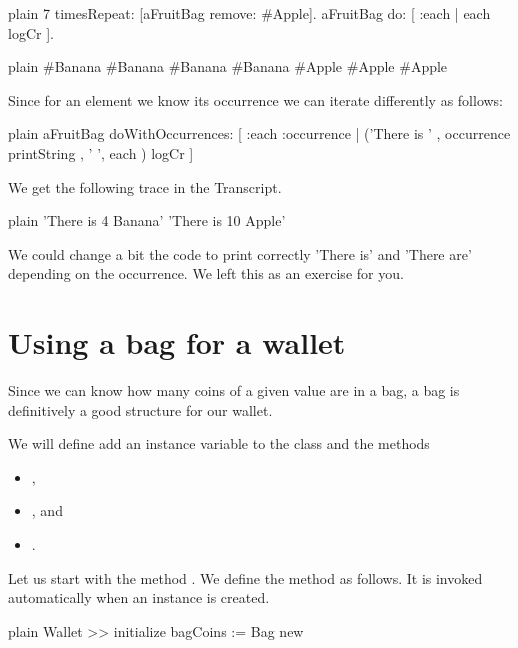 \documentclass[10pt,twoside,english]{_support/latex/sbabook/sbabook}
\begin{document}
\begin{displaycode}{plain}
7 timesRepeat: [aFruitBag remove: #Apple].
aFruitBag do: [ :each |  each logCr ].
\end{displaycode}

\begin{displaycode}{plain}
#Banana
#Banana
#Banana
#Banana
#Apple
#Apple
#Apple
\end{displaycode}

Since for an element we know its occurrence we can iterate differently as follows:

\begin{displaycode}{plain}
aFruitBag doWithOccurrences: [ :each :occurrence | ('There is ' ,  occurrence printString , ' ', each ) logCr ]
\end{displaycode}

We get the following trace in the Transcript. 

\begin{displaycode}{plain}
'There is 4 Banana'
'There is 10 Apple'
\end{displaycode}

We could change a bit the code to print correctly 'There is' and 'There are' depending on the occurrence. We left this as an exercise for you.
\section{Using a bag for a wallet}
Since we can know how many coins of a given value are in a bag, a bag is definitively a good structure for our wallet. 

We will define add an instance variable  to the class and the methods

\begin{itemize}
\item {}, 
\item {}, and  
\item {}.
\end{itemize}

Let us start with the method . We define the method  as follows. It is invoked automatically when an instance is created. 

\begin{displaycode}{plain}
Wallet >> initialize
	bagCoins := Bag new
\end{displaycode}
\end{document}
